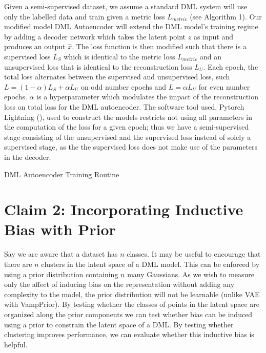 \documentclass[./dissertation.tex]{subfiles}
\begin{document}
    Given a semi-supervised dataset, we assume a standard DML system will use only the labelled data and train given a metric loss $L_{metric}$ (see Algorithm 1). Our modified model DML Autoencoder will extend the DML model's training regime by adding a decoder network which takes the latent point $z$ as input and produces an output $\hat{x}$. The loss function is then modified such that there is a supervised loss $L_{S}$ which is identical to the metric loss $L_{metric}$ and an unsupervised loss that is identical to the reconstruction loss $L_{U}$. Each epoch, the total loss alternates between the supervised and unsupervised loss, such $L = (1 - \alpha) L_{S} + \alpha L_{U}$ on odd number epochs and $L = \alpha L_{U}$ for even number epochs. $\alpha$ is a hyperparameter which modulates the impact of the reconstruction loss on total loss for the DML autoencoder. The software tool used, Pytorch Lightning (\cite{Falcon_PyTorch_Lightning_2019}), used to construct the models restricts not using all parameters in the computation of the loss for a given epoch; thus we have a semi-supervised stage consisting of the unsupervised and the supervised loss instead of solely a supervised stage, as the the supervised loss does not make use of the parameters in the decoder. \\

    \begin{algorithm}
    \caption{DML Autoencoder Training Routine}\label{alg:two}
    \end{algorithm}    
    
    \section{Claim 2: Incorporating Inductive Bias with Prior}
    Say we are aware that a dataset has $n$ classes. It may be useful to encourage that there are $n$ clusters in the latent space of a DML model. This can be enforced by using a prior distribution containing $n$ many Gaussians. As we wish to measure only the affect of inducing bias on the representation without adding any complexity to the model, the prior distribution will not be learnable (unlike VAE with VampPrior). By testing whether the classes of points in the latent space are organized along the prior components we can test whether bias can be induced using a prior to constrain the latent space of a DML. By testing whether clustering improves performance, we can evaluate whether this inductive bias is helpful. \\
    
\end{document}
